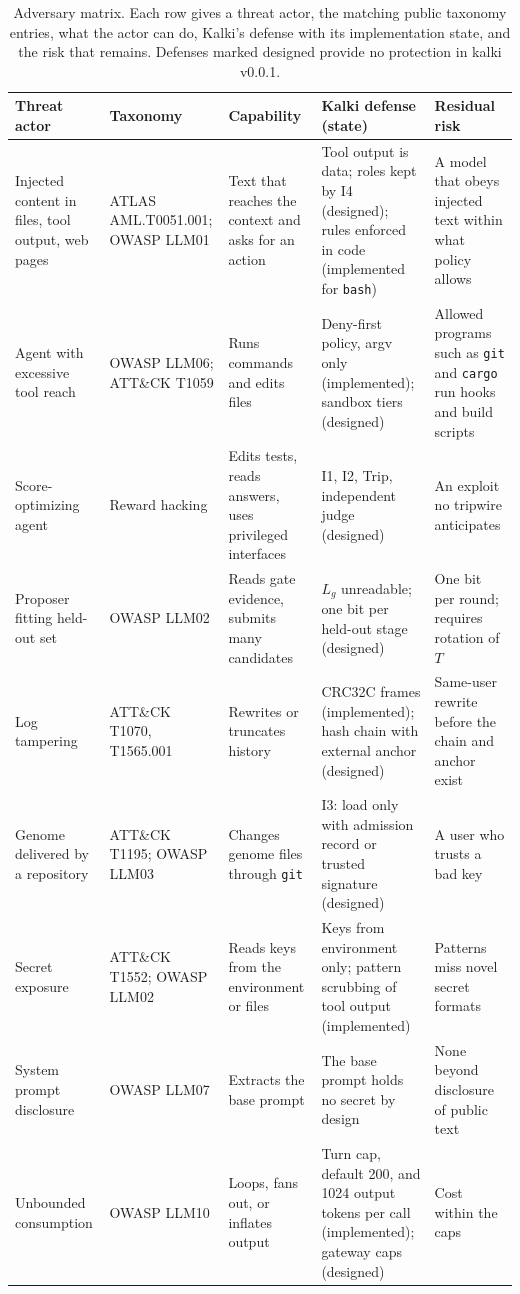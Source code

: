 \documentclass[11pt,a4paper]{article}
\begin{document}
\begin{table}[t]
\centering
\small
\begin{tabularx}{\textwidth}{@{}p{2.6cm}p{2.5cm}XXp{2.9cm}@{}}
\toprule
Threat actor & Taxonomy & Capability & Kalki defense (state) & Residual risk \\
\midrule
Injected content in files, tool output, web pages & ATLAS AML.T0051.001; OWASP LLM01 & Text that reaches the context and asks for an action & Tool output is data; roles kept by I4 (designed); rules enforced in code (implemented for \texttt{bash}) & A model that obeys injected text within what policy allows \\
Agent with excessive tool reach & OWASP LLM06; ATT\&CK T1059 & Runs commands and edits files & Deny-first policy, argv only (implemented); sandbox tiers (designed) & Allowed programs such as \texttt{git} and \texttt{cargo} run hooks and build scripts \\
Score-optimizing agent & Reward hacking \citep{karten2026primeagent} & Edits tests, reads answers, uses privileged interfaces & I1, I2, Trip, independent judge (designed) & An exploit no tripwire anticipates \\
Proposer fitting held-out set & OWASP LLM02 & Reads gate evidence, submits many candidates & $L_g$ unreadable; one bit per held-out stage (designed) & One bit per round; requires rotation of $T$ \\
Log tampering & ATT\&CK T1070, T1565.001 & Rewrites or truncates history & CRC32C frames (implemented); hash chain with external anchor (designed) & Same-user rewrite before the chain and anchor exist \\
Genome delivered by a repository & ATT\&CK T1195; OWASP LLM03 & Changes genome files through \texttt{git} & I3: load only with admission record or trusted signature (designed) & A user who trusts a bad key \\
Secret exposure & ATT\&CK T1552; OWASP LLM02 & Reads keys from the environment or files & Keys from environment only; pattern scrubbing of tool output (implemented) & Patterns miss novel secret formats \\
System prompt disclosure & OWASP LLM07 & Extracts the base prompt & The base prompt holds no secret by design & None beyond disclosure of public text \\
Unbounded consumption & OWASP LLM10 & Loops, fans out, or inflates output & Turn cap, default 200, and 1024 output tokens per call (implemented); gateway caps (designed) & Cost within the caps \\
\bottomrule
\end{tabularx}
\caption{Adversary matrix. Each row gives a threat actor, the matching public taxonomy entries, what the actor can do, Kalki's defense with its implementation state, and the risk that remains. Defenses marked designed provide no protection in kalki v0.0.1.}
\label{tab:threats}
\end{table}
\end{document}
